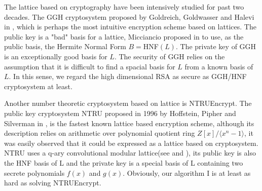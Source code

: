 \documentclass [11pt]{article}
\begin{document}
The lattice based on cryptography have been intensively studied for past two decades. The GGH cryptosystem proposed by Goldreich, Goldwasser and  Halevi in \cite{G}, which is perhaps the most intuitive encryption scheme based on lattices. The public key is a "bad" basis for a lattice,  Micciancio proposed in \cite{M4} to use, as the public basis, the Hermite Normal Form $B=$HNF$(L)$. The private key of GGH is  an  exceptionally good basis  for $L$. The security of GGH  relies on the assumption that it is difficult to find a spacial basis for $L$ from a known basis of  $L$. In this sense, we regard the high dimensional RSA as secure as GGH/HNF cryptosystem at least.

Another number theoretic cryptosystem based on lattice is NTRUEncrypt. The public key cryptosystem NTRU proposed in 1996 by Hoffstein, Pipher and Silverman in \cite{H}, is the fastest known lattice based encryption scheme, although its description relies on arithmetic over polynomial quotient ring $Z[x]/\langle x^{n}-1\rangle$, it was easily observed that it could be expressed as a lattice based on cryptosystem.
NTRU uses a q-ary convolutional modular lattice(see \cite{M2} and \cite{Z3}), its public key is also the HNF basis of L and the private key is 
a special basis of L containing two secrete polynomials $f(x)$ and $g(x)$. Obviously, our algorithm I is at least as hard as solving NTRUEncrypt.
\end{document}
